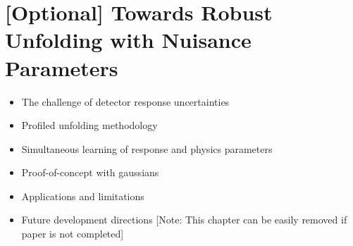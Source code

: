 \chapter{[Optional] Towards Robust Unfolding with Nuisance Parameters}
\begin{itemize}
    \item The challenge of detector response uncertainties
    \item Profiled unfolding methodology
    \item Simultaneous learning of response and physics parameters
    \item Proof-of-concept with gaussians
    \item Applications and limitations
    \item Future development directions [Note: This chapter can be easily removed if paper is not completed]
\end{itemize}